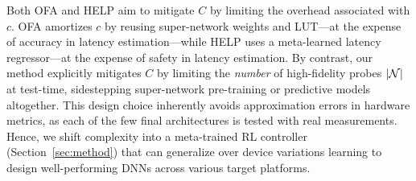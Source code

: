 Both OFA and HELP aim to mitigate \( C \) by limiting the overhead associated with \(c \). OFA amortizes \( c \) by reusing super-network weights and LUT---at the expense of accuracy in latency estimation---while HELP uses a meta-learned latency regressor---at the expense of safety in latency estimation. 
By contrast, our method explicitly mitigates \( C \) by limiting the \emph{number} of high-fidelity probes \(\vert \mathcal N \vert \) at test-time, sidestepping super-network pre-training or predictive models altogether. 
This design choice inherently avoids approximation errors in hardware metrics, as each of the few final architectures is tested with real measurements. Hence, we shift complexity into a meta-trained RL controller (Section~\ref{sec:method}) that can generalize over device variations learning to design well-performing DNNs across various target platforms.